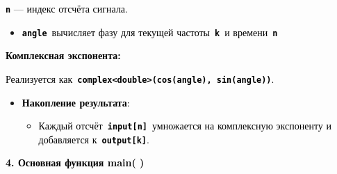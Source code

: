 \documentclass[a4paper]{article}
\newcommand\textstyleStrongEmphasis[1]{\textbf{#1}}
\newcommand\textstyleSourceText[1]{\texttt{#1}}
\newcommand\textstyleBulletSymbols[1]{\textrm{#1}}
\renewcommand\thepage{\arabic{page}}
\begin{document}
\bigskip

\textstyleStrongEmphasis{\textstyleSourceText{\textrm{\textcolor{black}{n}}}}\textcolor{black}{ — индекс отсчёта
сигнала.}

\begin{itemize}[series=listLv,label=\textstyleBulletSymbols{•}]
\item \textstyleStrongEmphasis{\textstyleSourceText{\textrm{\textcolor{black}{angle}}}}\textcolor{black}{ вычисляет фазу
для текущей частоты }\textstyleSourceText{\textrm{\textbf{\textcolor{black}{k}}}}\textcolor{black}{ и
времени }\textstyleSourceText{\textrm{\textbf{\textcolor{black}{n}}}}
\end{itemize}
\textstyleStrongEmphasis{\textcolor{black}{Комплексная экспонента}}\textbf{\textcolor{black}{:}}\textcolor{black}{ }

\textcolor{black}{Реализуется
как }\textstyleSourceText{\textrm{\textbf{\textcolor{black}{complex{\textless}double{\textgreater}(cos(angle),
sin(angle))}}}}\textcolor{black}{.}

\begin{itemize}[series=listLvi,label=\textstyleBulletSymbols{•}]
\item \textstyleStrongEmphasis{\textcolor{black}{Накопление результата}}\textcolor{black}{:}

\begin{itemize}[series=listLvi,label=\textstyleBulletSymbols{•}]
\item \textcolor{black}{Каждый
отсчёт }\textstyleSourceText{\textrm{\textbf{\textcolor{black}{input[n]}}}}\textcolor{black}{ умножается на комплексную
экспоненту и добавляется к }\textstyleSourceText{\textrm{\textbf{\textcolor{black}{output[k]}}}}\textcolor{black}{.}
\end{itemize}
\end{itemize}

\bigskip


\bigskip

{\centering\color{black}
\thepage{}
\par}


\bigskip


\bigskip


\bigskip

{\bfseries
\textcolor{black}{4. Основная функция
}\foreignlanguage{english}{\textcolor{black}{main}}\foreignlanguage{russian}{\textcolor{black}{( )}}}


\bigskip

\paragraph[]{\color{black} }
\begin{center}
\end{center}
\end{document}
